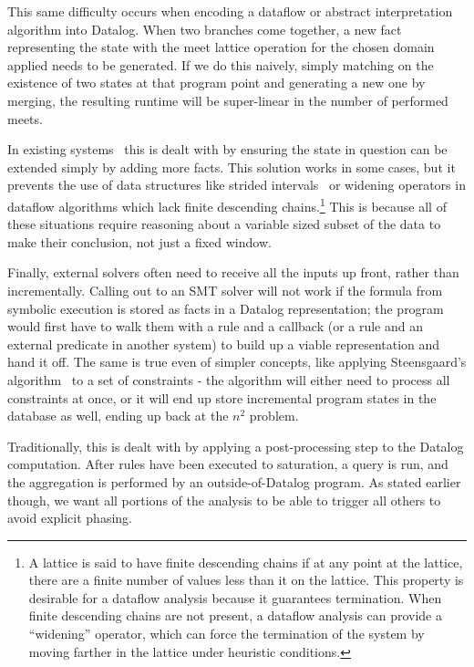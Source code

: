 This same difficulty occurs when encoding a dataflow or abstract interpretation algorithm into Datalog.
When two branches come together, a new fact representing the state with the meet lattice operation for the chosen domain applied needs to be generated.
If we do this naively, simply matching on the existence of two states at that program point and generating a new one by merging, the resulting runtime will be super-linear in the number of performed meets.

In existing systems~\cite{doop1} this is dealt with by ensuring the state in question can be extended simply by adding more facts.
This solution works in some cases, but it prevents the use of data structures like strided intervals~\cite{vsa} or widening operators in dataflow algorithms which lack finite descending chains.\footnote{
A lattice is said to have finite descending chains if at any point at the lattice, there are a finite number of values less than it on the lattice.
This property is desirable for a dataflow analysis because it guarantees termination.
When finite descending chains are not present, a dataflow analysis can provide a ``widening'' operator, which can force the termination of the system by moving farther in the lattice under heuristic conditions.
}
This is because all of these situations require reasoning about a variable sized subset of the data to make their conclusion, not just a fixed window.

Finally, external solvers often need to receive all the inputs up front, rather than incrementally.
Calling out to an SMT solver will not work if the formula from symbolic execution is stored as facts in a Datalog representation; the program would first have to walk them with a rule and a callback (or a rule and an external predicate in another system) to build up a viable representation and hand it off.
The same is true even of simpler concepts, like applying Steensgaard's algorithm~\cite{steensgaard-alias} to a set of constraints - the algorithm will either need to process all constraints at once, or it will end up store incremental program states in the database as well, ending up back at the $n^2$ problem.

Traditionally, this is dealt with by applying a post-processing step to the Datalog computation.
After rules have been executed to saturation, a query is run, and the aggregation is performed by an outside-of-Datalog program.
As stated earlier though, we want all portions of the analysis to be able to trigger all others to avoid explicit phasing.

